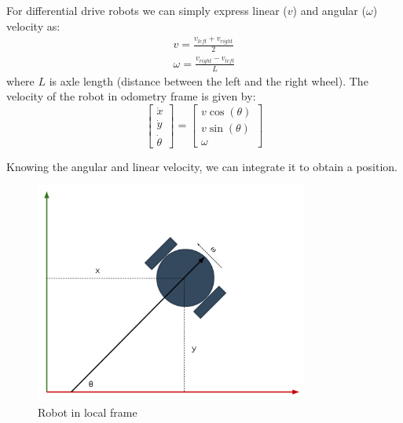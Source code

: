 For differential drive robots we can simply express linear ($v$) and angular ($\omega$) velocity as:
\begin{equation}
\begin{aligned}
    v = \frac{v_{left} + v_{right}}{2}  \\
    \omega = \frac{v_{right} - v_{left}}{L}
\end{aligned}
\end{equation}
where $ L $ is axle length (distance between the left and the right wheel). The velocity of the robot in odometry frame is given by:
\begin{equation}
\begin{bmatrix}
\dot{x} \\
\dot{y} \\
\dot{\theta}
\end{bmatrix} = \begin{bmatrix}
v \cos(\theta) \\
v \sin(\theta) \\
\omega
\end{bmatrix}
\end{equation}

Knowing the angular and linear velocity, we can integrate it to obtain a position.

\begin{figure}[H]
    \centering
    \includegraphics[width=0.8\textwidth]{simulation/figures/odometry.pdf}
    \caption{Robot in local frame \cite{noauthor_16-311_nodate}}
    \label{fig:simulation:odometry_schema}
\end{figure}

